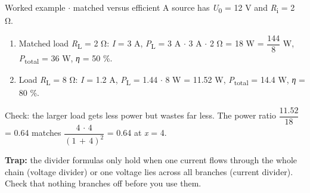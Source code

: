 \documentclass[11pt]{article}
\begin{document}
\begin{keepsection}
\begin{keepsection}
\begin{center}
\begin{minipage}[t]{0.950\linewidth}
\par{}\end{minipage}
\end{center}

\begin{workedbox}{Worked example \ensuremath{\cdot} matched versus efficient}
A source has \textit{U}\textsubscript{0} = 12 V and \textit{R}\textsubscript{i} = 2 Ω.

\begin{enumerate}
\item Matched load \textit{R}\textsubscript{L} = 2 Ω: \textit{I} = 3 A, \textit{P}\textsubscript{L} = 3 A \ensuremath{\cdot} 3 A \ensuremath{\cdot} 2 Ω = 18 W = {\small\ensuremath{\dfrac{144}{8}}} W, \textit{P}\textsubscript{total} = 36 W, \textit{η} = 50 \%.
\item Load \textit{R}\textsubscript{L} = 8 Ω: \textit{I} = 1.2 A, \textit{P}\textsubscript{L} = 1.44 \ensuremath{\cdot} 8 W = 11.52 W, \textit{P}\textsubscript{total} = 14.4 W, \textit{η} = 80 \%.
\end{enumerate}

Check: the larger load gets less power but wastes far less. The power ratio {\small\ensuremath{\dfrac{11.52}{18}}} = 0.64 matches {\small\ensuremath{\dfrac{4\, \cdot \, 4}{(1\, +\, 4)^{2}}}} = 0.64 at \textit{x} = 4.
\end{workedbox}

\begin{notebox}\textbf{Trap:} the divider formulas only hold when one current flows through the whole chain (voltage divider) or one voltage lies across all branches (current divider). Check that nothing branches off before you use them.\end{notebox}


\end{keepsection}
\end{keepsection}
\end{document}
